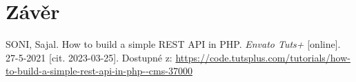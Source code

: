 \documentclass[titlepage]{article}
\begin{document}
\section*{Závěr}


\begin{thebibliography}{9}
    SONI, Sajal. How to build a simple REST API in PHP. \emph{En\-va\-to Tuts+} [on\-li\-ne]. 27-5-2021 [cit. 2023-03-25]. Dostupné z: \url{https://code.tutsplus.com/tutorials/how-to-build-a-simple-rest-api-in-php--cms-37000}
\end{thebibliography}

    
\end{document}
